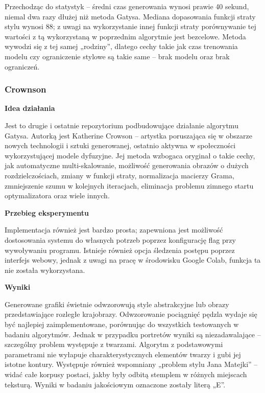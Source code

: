 \documentclass[12pt]{article}
\begin{document}
Przechodząc do statystyk – średni czas generowania wynosi prawie 40 sekund, niemal dwa razy dłużej niż metoda Gatysa. Mediana dopasowania funkcji straty stylu wynosi 88; z uwagi na wykorzystanie innej funkcji straty porównywanie tej wartości z tą wykorzystaną w poprzednim algorytmie jest bezcelowe. Metoda wywodzi się z tej samej „rodziny”, dlatego cechy takie jak czas trenowania modelu czy ograniczenie stylowe są takie same – brak modelu oraz brak ograniczeń.

\subsubsection{Crownson}

\noindent\textbf{Idea działania}

Jest to drugie i ostatnie repozytorium podbudowujące działanie algorytmu Gatysa. Autorką jest Katherine Crowson – artystka poruszająca się w obszarze nowych technologii i sztuki generowanej, ostatnio aktywna w społeczności wykorzystującej modele dyfuzyjne. Jej metoda wzbogaca oryginał o takie cechy, jak automatyczne multi-skalowanie, możliwość generowania obrazów o dużych rozdzielczościach, zmiany w funkcji straty, normalizacja macierzy Grama, zmniejszenie szumu w kolejnych iteracjach, eliminacja problemu zimnego startu optymalizatora oraz wiele innych.

\noindent\textbf{Przebieg eksperymentu}

Implementacja również jest bardzo prosta; zapewniona jest możliwość dostosowania systemu do własnych potrzeb poprzez konfigurację flag przy wywoływaniu programu. Istnieje również opcja śledzenia postępu poprzez interfejs webowy, jednak z uwagi na pracę w środowisku Google Colab, funkcja ta nie została wykorzystana.

\noindent\textbf{Wyniki}

Generowane grafiki świetnie odwzorowują style abstrakcyjne lub obrazy przedstawiające rozległe krajobrazy. Odwzorowanie pociągnięć pędzla wydaje się być najlepiej zaimplementowane, porównując do wszystkich testowanych w badaniu algorytmów. Jednak w przypadku portretów wyniki są niezadawalające – szczególny problem występuje z twarzami. Algorytm z podstawowymi parametrami nie wyłapuje charakterystycznych elementów twarzy i gubi jej istotne kontury. Występuje również wspomniany „problem stylu Jana Matejki” – widać całe korpusy postaci, jakby były odbitą stemplem w różnych miejscach teksturą. Wyniki w badaniu jakościowym oznaczone zostały literą „E”.
\end{document}
